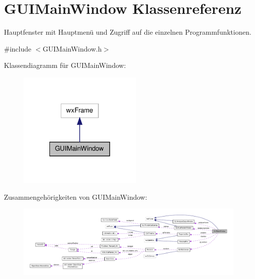 \hypertarget{classGUIMainWindow}{\section{G\-U\-I\-Main\-Window Klassenreferenz}
\label{classGUIMainWindow}
}


Hauptfenster mit Hauptmenü und Zugriff auf die einzelnen Programmfunktionen.  




{\ttfamily \#include $<$G\-U\-I\-Main\-Window.\-h$>$}



Klassendiagramm für G\-U\-I\-Main\-Window\-:\nopagebreak
\begin{figure}[H]
\begin{center}
\leavevmode
\includegraphics[width=170pt]{classGUIMainWindow__inherit__graph}
\end{center}
\end{figure}


Zusammengehörigkeiten von G\-U\-I\-Main\-Window\-:
\nopagebreak
\begin{figure}[H]
\begin{center}
\leavevmode
\includegraphics[width=350pt]{classGUIMainWindow__coll__graph}
\end{center}
\end{figure}
